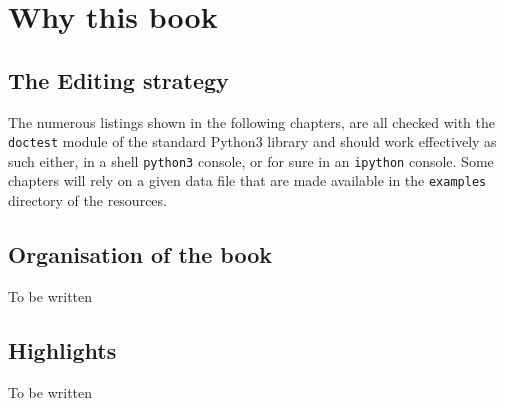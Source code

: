 \chapter*{Why this book}
\label{sec:0}



\section*{The Editing strategy}
\label{sec:0.1}

The numerous listings shown in the following chapters, are all checked with the \texttt{doctest} module of the standard Python3 library and should work effectively as such either, in a shell \texttt{python3} console, or for sure in an \texttt{ipython} console. Some chapters will rely on a given data file that are made available in the \texttt{examples} directory of the \Digraph resources. 



\section*{Organisation of the book}
\label{sec:0.2}

To be written

\section*{Highlights}
\label{asec:0.1}

To be written


